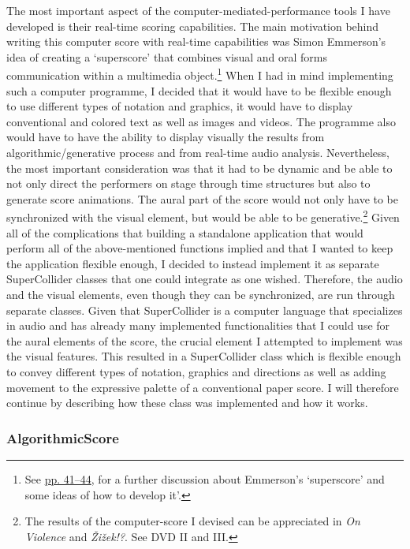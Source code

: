 The most important aspect of the computer-mediated-performance tools I have developed is their real-time scoring capabilities. The main motivation behind writing this computer score with real-time capabilities was Simon Emmerson's idea of creating a `superscore' that combines visual and oral forms communication within a multimedia object.\footnote{See \hyperlink{superscore}{pp. 41--44}, for a further discussion about Emmerson's `superscore' and some ideas of how to develop it'.} When I had in mind implementing such a computer programme, I decided that it would have to be flexible enough to use different types of notation and graphics, it would have to display conventional and colored text as well as images and videos. The programme also would have to have the ability to display visually the results from algorithmic/generative process and from real-time audio analysis. Nevertheless, the most important consideration was that it had to be dynamic and be able to not only direct the performers on stage through time structures but also to generate score animations. The aural part of the score would not only have to be synchronized with the visual element, but would be able to be generative.\footnote{The results of the computer-score I devised can be appreciated in \emph{On Violence} and \emph{\v{Z}i\v{z}ek!?}. See DVD II and III.} Given all of the complications that building a standalone application that would perform all of the above-mentioned functions implied and that I wanted to keep the application flexible enough, I decided to instead implement it as separate SuperCollider classes that one could integrate as one wished. Therefore, the audio and the visual elements, even though they can be synchronized, are run through separate classes. Given that SuperCollider is a computer language that specializes in audio and has already many implemented functionalities that I could use for the aural elements of the score, the crucial element I attempted to implement was the visual features. This resulted in a SuperCollider class which is flexible enough to convey different types of notation, graphics and directions as well as adding movement to the expressive palette of a conventional paper score. I will therefore continue by describing how these class was implemented and how it works.

\subsubsection{AlgorithmicScore}

